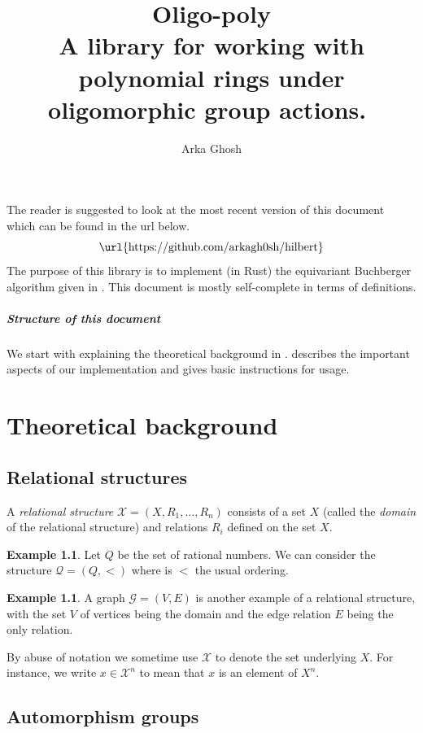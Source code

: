 \documentclass[12pt,a4paper,article]{memoir}
\date{}
\title{Oligo-poly\\
\vspace{10pt}
\large
A library for working with polynomial rings under oligomorphic group actions.
$ $\\}
\author{Arka Ghosh}
\newcommand{\struct}{\mathcal{X}}
\newcommand{\dloQ}{\mathcal{Q}}
\newcommand{\emphdef}[1]{\emph{\textcolor{BrickRed}{#1}}}
\theoremstyle{definition}
\newtheorem{example}[theorem]{Example}
\begin{document}
\maketitle
\raggedbottom
%
\tableofcontents
%
\pagebreak
\noindent
The reader is suggested to look at the most recent version of this document which can be found in the url below.
\[
\text{
\url{https://github.com/arkagh0sh/hilbert}
}
\]
The purpose of this library is to implement (in Rust) the equivariant Buchberger algorithm given in \cite{GL25}.
This document is mostly self-complete in terms of definitions.
%
\paragraph*{Structure of this document}
%
We start with explaining the theoretical background in .
 describes the important aspects of our implementation and gives basic instructions for usage.
%
\chapter{Theoretical background}\label{sec:theory}
%

\section{Relational structures}
%
A \emphdef{relational structure} $\struct = (X,R_1,\dots,R_n)$ consists of a
set $X$ (called the \emphdef{domain} of the relational structure) and relations $R_i$ defined on the set $X$.
%
\begin{example}
Let $Q$ be the set of rational numbers.
We can consider the structure $\dloQ = (Q,<)$ where is $<$ the usual ordering.
\end{example}
%
\begin{example}
A graph $\mathcal{G} = (V,E)$ is another example of a relational structure,
with the set $V$ of vertices being the domain and the edge relation $E$ being the only relation.
\end{example}

By abuse of notation we sometime use $\struct$ to denote the set underlying $X$.
For instance,
we write $x \in\struct^n$ to mean that $x$ is an element of $X^n$.

\section{Automorphism groups}
\end{document}

